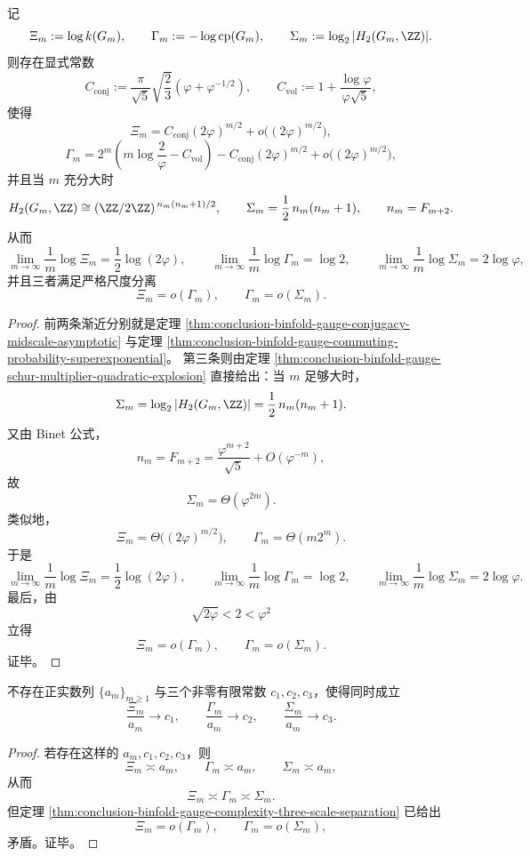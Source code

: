 \begin{theorem}\label{thm:conclusion-binfold-gauge-complexity-three-scale-separation}
记
\[
\Xi_m:=\log k(G_m),
\qquad
\Gamma_m:=-\log \mathrm{cp}(G_m),
\qquad
\Sigma_m:=\log_2|H_2(G_m,\ZZ)|.
\]
则存在显式常数
\[
C_{\mathrm{conj}}
:=
\frac{\pi}{\sqrt5}\sqrt{\frac23}\left(\varphi+\varphi^{-1/2}\right),
\qquad
C_{\mathrm{vol}}
:=
1+\frac{\log\varphi}{\varphi\sqrt5},
\]
使得
\[
\Xi_m
=
C_{\mathrm{conj}}(2\varphi)^{m/2}
+o\!\bigl((2\varphi)^{m/2}\bigr),
\]
\[
\Gamma_m
=
2^m\left(m\log\frac{2}{\varphi}-C_{\mathrm{vol}}\right)
-C_{\mathrm{conj}}(2\varphi)^{m/2}
+o\!\bigl((2\varphi)^{m/2}\bigr),
\]
并且当 \(m\) 充分大时
\[
H_2(G_m,\ZZ)\cong (\ZZ/2\ZZ)^{\,n_m(n_m+1)/2},
\qquad
\Sigma_m=\frac12\,n_m(n_m+1),
\qquad
n_m=F_{m+2}.
\]
从而
\[
\lim_{m\to\infty}\frac1m\log \Xi_m=\frac12\log(2\varphi),
\qquad
\lim_{m\to\infty}\frac1m\log \Gamma_m=\log 2,
\qquad
\lim_{m\to\infty}\frac1m\log \Sigma_m=2\log\varphi,
\]
并且三者满足严格尺度分离
\[
\Xi_m=o(\Gamma_m),
\qquad
\Gamma_m=o(\Sigma_m).
\]
\end{theorem}
\begin{proof}
前两条渐近分别就是定理 \ref{thm:conclusion-binfold-gauge-conjugacy-midscale-asymptotic} 与定理 \ref{thm:conclusion-binfold-gauge-commuting-probability-superexponential}。
第三条则由定理 \ref{thm:conclusion-binfold-gauge-schur-multiplier-quadratic-explosion} 直接给出：当 \(m\) 足够大时，
\[
\Sigma_m=\log_2|H_2(G_m,\ZZ)|=\frac12\,n_m(n_m+1).
\]
又由 Binet 公式，
\[
n_m=F_{m+2}=\frac{\varphi^{m+2}}{\sqrt5}+O(\varphi^{-m}),
\]
故
\[
\Sigma_m=\Theta(\varphi^{2m}).
\]
类似地，
\[
\Xi_m=\Theta\!\bigl((2\varphi)^{m/2}\bigr),
\qquad
\Gamma_m=\Theta(m2^m).
\]
于是
\[
\lim_{m\to\infty}\frac1m\log \Xi_m=\frac12\log(2\varphi),
\qquad
\lim_{m\to\infty}\frac1m\log \Gamma_m=\log 2,
\qquad
\lim_{m\to\infty}\frac1m\log \Sigma_m=2\log\varphi.
\]
最后，由
\[
\sqrt{2\varphi}<2<\varphi^2
\]
立得
\[
\Xi_m=o(\Gamma_m),
\qquad
\Gamma_m=o(\Sigma_m).
\]
证毕。
\end{proof}

\begin{proposition}\label{prop:conclusion-binfold-gauge-complexity-no-single-parameter-renormalization}
不存在正实数列 \(\{a_m\}_{m\ge 1}\) 与三个非零有限常数 \(c_1,c_2,c_3\)，使得同时成立
\[
\frac{\Xi_m}{a_m}\to c_1,
\qquad
\frac{\Gamma_m}{a_m}\to c_2,
\qquad
\frac{\Sigma_m}{a_m}\to c_3.
\]
\end{proposition}
\begin{proof}
若存在这样的 \(a_m,c_1,c_2,c_3\)，则
\[
\Xi_m\asymp a_m,
\qquad
\Gamma_m\asymp a_m,
\qquad
\Sigma_m\asymp a_m,
\]
从而
\[
\Xi_m\asymp \Gamma_m\asymp \Sigma_m.
\]
但定理 \ref{thm:conclusion-binfold-gauge-complexity-three-scale-separation} 已给出
\[
\Xi_m=o(\Gamma_m),
\qquad
\Gamma_m=o(\Sigma_m),
\]
矛盾。证毕。
\end{proof}
